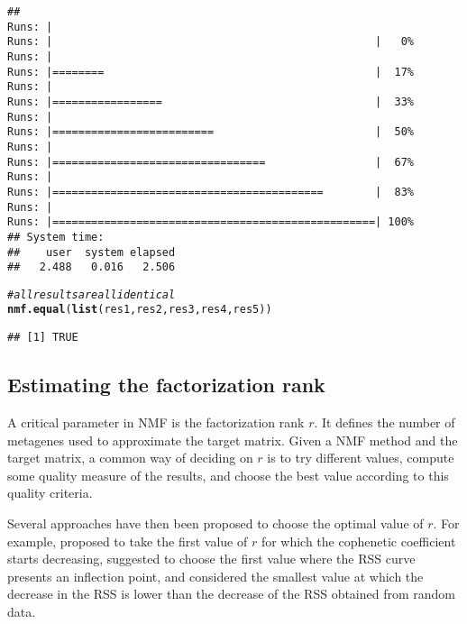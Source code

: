 \documentclass[a4paper]{article}\usepackage[]{graphicx}\usepackage[]{color}
\makeatletter
\newcommand{\hlcom}[1]{\textcolor[rgb]{0.678,0.584,0.686}{\textit{#1}}}%
\newcommand{\hlstd}[1]{\textcolor[rgb]{0.345,0.345,0.345}{#1}}%
\newcommand{\hlkwd}[1]{\textcolor[rgb]{0.737,0.353,0.396}{\textbf{#1}}}%
\newenvironment{kframe}{%
 \def\at@end@of@kframe{}%
 \ifinner\ifhmode%
  \def\at@end@of@kframe{\end{minipage}}%
  \begin{minipage}{\columnwidth}%
 \fi\fi%
 \def\FrameCommand##1{\hskip\@totalleftmargin \hskip-\fboxsep
 \colorbox{shadecolor}{##1}\hskip-\fboxsep
     \hskip-\linewidth \hskip-\@totalleftmargin \hskip\columnwidth}%
 \MakeFramed {\advance\hsize-\width
   \@totalleftmargin\z@ \linewidth\hsize
   \@setminipage}}%
 {\par\unskip\endMakeFramed%
 \at@end@of@kframe}
\newenvironment{knitrout}{}{} %
\renewcommand{\cite}[1]{\parencite{#1}}
\makeatother
\begin{document}
\begin{knitrout}
\begin{kframe}
{\ttfamily\noindent\itshape\color{messagecolor}{\#\# NMF algorithm: 'brunet'\\\#\# Multiple runs: 5\\\#\# Mode: sequential [foreach:doSEQ]}}\begin{verbatim}
## 
Runs: |                                                        
Runs: |                                                  |   0%
Runs: |                                                        
Runs: |========                                          |  17%
Runs: |                                                        
Runs: |=================                                 |  33%
Runs: |                                                        
Runs: |=========================                         |  50%
Runs: |                                                        
Runs: |=================================                 |  67%
Runs: |                                                        
Runs: |==========================================        |  83%
Runs: |                                                        
Runs: |==================================================| 100%
## System time:
##    user  system elapsed 
##   2.488   0.016   2.506
\end{verbatim}
\begin{alltt}
\hlcom{# all results are all identical}
\hlkwd{nmf.equal}\hlstd{(}\hlkwd{list}\hlstd{(res1, res2, res3, res4, res5))}
\end{alltt}
\begin{verbatim}
## [1] TRUE
\end{verbatim}
\end{kframe}
\end{knitrout}


\subsection{Estimating the factorization rank}
A critical parameter in NMF is the factorization rank $r$. 
It defines the number of metagenes used to approximate the target matrix.
Given a NMF method and the target matrix, a common way of deciding on $r$ is to try different values, compute some quality measure of the results, and choose the best value according to this quality criteria.

Several approaches have then been proposed to choose the optimal value of $r$.
For example, \cite{Brunet2004} proposed to take the first value of $r$ for which the cophenetic coefficient starts decreasing, \cite{Hutchins2008} suggested to choose the first value where the RSS curve presents an inflection point, and \cite{Frigyesi2008} considered the smallest value at which the decrease in the RSS is lower than the decrease of the RSS obtained from random data.
\end{document}
